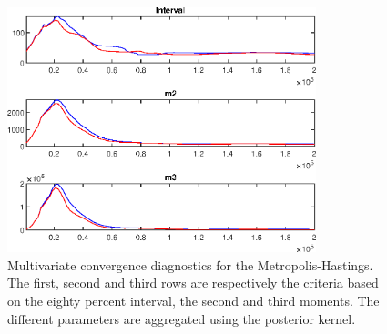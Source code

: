 
\begin{figure}[H]
\centering 
\includegraphics[width=0.8\textwidth]{BRS_sectoral_rest/Output/BRS_sectoral_rest_mdiag}
\caption{Multivariate convergence diagnostics for the Metropolis-Hastings.
The first, second and third rows are respectively the criteria based on
the eighty percent interval, the second and third moments. The different 
parameters are aggregated using the posterior kernel.}\label{Fig:MultivariateDiagnostics}
\end{figure}

